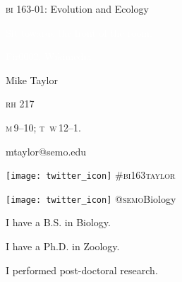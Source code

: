 \documentclass[t]{beamer}
\begin{document}
%
{
\begin{frame}[b]{\textcolor{orange7}{\textsc{bi} 163-01: Evolution and Ecology}}

\begin{center}\LARGE\textcolor{white}{Sit towards the front of the room.}\end{center}

\hfill\textcolor{white}{\tiny Fir0002, Wikimedia }
\end{frame}
}
%
{
\begin{frame}[t]
	\large
	\vspace{5ex}
	\hangpara\hspace{17em} Mike Taylor

	\hangpara\hspace{17em} \textsc{rh} 217

	\hangpara\hspace{17em} \textsc{m}\,9--10; \textsc{t\ w}\,12--1.

	\hangpara\hspace{17em} mtaylor@semo.edu
	
	\hangpara \hspace{17em} \texttt{[image: twitter\_icon]} \#\textsc{bi}163\textsc{taylor} %

	\hangpara \hspace{17em} \texttt{[image: twitter\_icon]} @\textsc{semo}Biology\\
\end{frame}
}
%
{
\begin{frame}[t]{I have a B.S. in Biology.}
		
\end{frame}
}
%
{
	\begin{frame}[t]{I have a Ph.D. in Zoology.}
		
	\end{frame}
}
%
{
	\begin{frame}[t]{I performed post-doctoral research.}
		
	\end{frame}
}
\end{document}
